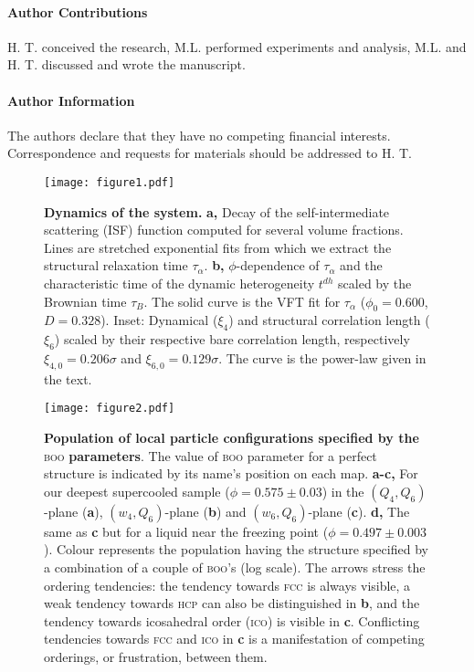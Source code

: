 \paragraph*{\bf Author Contributions}
H. T. conceived the research, M.L. performed experiments and analysis, M.L. and H. T. discussed and wrote the manuscript.

\paragraph*{\bf Author Information} 
The authors declare that they have no competing financial interests. 
Correspondence and requests for materials should be addressed to 
H. T. 

\clearpage

\begin{figure}
\begin{center}
\texttt{[image: figure1.pdf]}
\end{center}
\caption{\textbf{Dynamics of the system.} {\bf a,} Decay of the self-intermediate scattering (ISF) function computed for several volume fractions. Lines are stretched exponential fits from which we extract the structural relaxation time $\tau_\alpha$. {\bf b,} $\phi$-dependence of $\tau_\alpha$ and the characteristic time of the dynamic heterogeneity $t^{dh}$ scaled by the Brownian time $\tau_B$. The solid curve is the VFT fit for $\tau_\alpha$ ($\phi_0=0.600$, $D=0.328$). Inset: Dynamical ($\xi_4$) and structural correlation length ($\xi_6$) scaled by their respective bare correlation length, respectively $\xi_{4,0}=0.206\sigma$ and $\xi_{6,0}=0.129\sigma$. The curve is the power-law given in the text.}
	\label{fig:vft}
\end{figure}

\clearpage

\begin{figure}
\begin{center}
\texttt{[image: figure2.pdf]}
\end{center}
\caption{\textbf{Population of local particle configurations specified by the }\textsc{boo}\textbf{ parameters}. The value of \textsc{boo} parameter for a perfect structure is  indicated by its name's position on each map. {\bf a-c,} For our deepest supercooled sample ($\phi=0.575\pm 0.03$) in the $(Q_4,Q_6)$-plane ({\bf a}), $(w_4,Q_6)$-plane ({\bf b}) and $(w_6,Q_6)$-plane ({\bf c}). {\bf d,} The same as {\bf c} but for a liquid near the freezing point ($\phi = 0.497 \pm 0.003$). Colour represents the population having the structure  specified by a combination of a couple of \textsc{boo}'s (log scale). The arrows stress the ordering tendencies: the tendency towards \textsc{fcc} is always visible, a weak tendency towards \textsc{hcp} can also be distinguished in {\bf b}, and the tendency towards icosahedral order (\textsc{ico}) is visible in {\bf c}. 
Conflicting tendencies towards \textsc{fcc} and \textsc{ico} in {\bf c} is a manifestation of competing orderings, or frustration, between them.}
	\label{fig:maps}
\end{figure}

